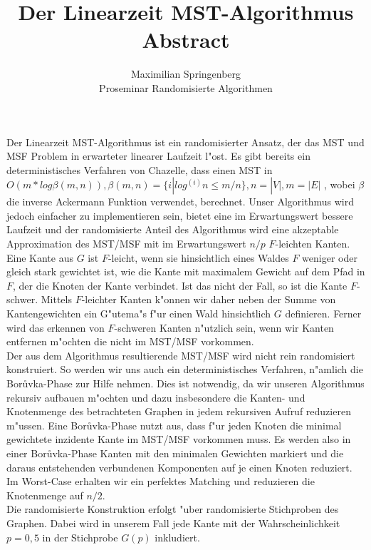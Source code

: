 \documentclass[a4paper,12pt,times,german]{cls/summary}
\title{Der Linearzeit MST-Algorithmus\\
       \LARGE Abstract}
\author{Maximilian Springenberg\\
        \small Proseminar Randomisierte Algorithmen}
\date{}
\begin{document}
\maketitle
Der Linearzeit MST-Algorithmus ist ein randomisierter Ansatz, der das MST und MSF
    Problem in erwarteter linearer Laufzeit l"ost.
    Es gibt bereits ein deterministisches Verfahren von Chazelle, dass einen MST in
    $O(m * log \beta(m,n)), \beta(m,n) = \{i | log^{(i)} n \leq m / n\}, n = |V|, m = |E|$
    , wobei $\beta$ die inverse Ackermann Funktion verwendet, berechnet.
    Unser Algorithmus wird jedoch einfacher zu implementieren sein, bietet eine
    im Erwartungswert bessere Laufzeit und der randomisierte Anteil des 
    Algorithmus wird eine akzeptable Approximation des MST/MSF mit 
    im Erwartungswert $n/p$ $F$-leichten Kanten.\\
Eine Kante aus $G$ ist $F$-leicht, wenn sie hinsichtlich eines Waldes $F$ 
    weniger oder gleich stark
    gewichtet ist, wie die Kante mit maximalem Gewicht auf dem Pfad in $F$,
    der die Knoten der Kante verbindet. 
    Ist das nicht der Fall, so ist die Kante $F$-schwer.
    Mittels $F$-leichter Kanten k"onnen wir daher neben der Summe von Kantengewichten
    ein G"utema"s f"ur einen Wald hinsichtlich $G$ definieren.
    Ferner wird das erkennen von $F$-schweren Kanten n"utzlich sein, wenn wir
    Kanten entfernen m"ochten die nicht im MST/MSF vorkommen.\\
Der aus dem Algorithmus resultierende MST/MSF wird nicht rein randomisiert 
    konstruiert. 
    So werden wir uns auch ein deterministisches Verfahren, n"amlich die
    Bor\r uvka-Phase zur Hilfe nehmen.
    Dies ist notwendig, da wir unseren Algorithmus rekursiv
    aufbauen m"ochten und dazu insbesondere die Kanten- und Knotenmenge des
    betrachteten Graphen in jedem rekursiven Aufruf reduzieren m"ussen.
    Eine Bor\r uvka-Phase nutzt aus, dass f"ur jeden Knoten die minimal gewichtete
    inzidente Kante im MST/MSF vorkommen muss. 
    Es werden also in einer Bor\r uvka-Phase Kanten mit den minimalen Gewichten
    markiert und die 
    daraus entstehenden verbundenen Komponenten auf je einen Knoten reduziert.
    Im Worst-Case erhalten wir ein perfektes Matching und reduzieren die 
    Knotenmenge auf $n/2$.\\
Die randomisierte Konstruktion erfolgt "uber randomisierte Stichproben 
    des Graphen.
    Dabei wird in unserem Fall jede Kante mit der Wahrscheinlichkeit $p=0,5$
    in der Stichprobe $G(p)$ inkludiert. 
\end{document}
